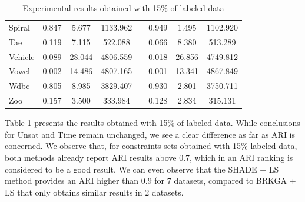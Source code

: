 \documentclass[review]{elsarticle}
\begin{document}
\begin{table}[!h]
{\begin{tabular}{l ccc c ccc}
			Spiral & 0.847 & 5.677 & 1133.962 && 0.949 & 1.495 & 1102.920 \\
			Tae & 0.119 & 7.115 & 522.088 && 0.066 & 8.380 & 513.289 \\
			Vehicle & 0.089 & 28.044 & 4806.559 && 0.018 & 26.856 & 4749.812 \\
			Vowel & 0.002 & 14.486 & 4807.165 && 0.001 & 13.341 & 4867.849 \\
			Wdbc & 0.805 & 8.985 & 3829.407 && 0.930 & 2.801 & 3750.711 \\
			Zoo & 0.157 & 3.500 & 333.984 && 0.128 & 2.834 & 315.131 \\
			\hline
			
		\end{tabular}}
		
	\caption{Experimental results obtained with 15\% of labeled data}
	\label{tab:results15}
\end{table}

Table \ref{tab:results15} presents the results obtained with 15\% of labeled data. While conclusions for Unsat and Time remain unchanged, we see a clear difference as far as ARI is concerned. We observe that, for constraints sets obtained with 15\% labeled data, both methods already report ARI results above 0.7, which in an ARI ranking is considered to be a good result. We can even observe that the SHADE + LS method provides an ARI higher than 0.9 for 7 datasets, compared to BRKGA + LS that only obtains similar results in 2 datasets.
	
\end{document}
